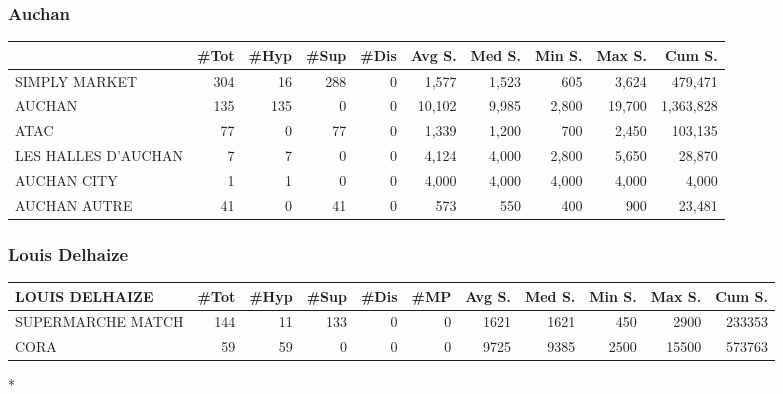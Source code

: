 \documentclass[11pt]{article}
\begin{document}
\subsubsection{Auchan}

\begin{table}[H]
\footnotesize
\setlength{\tabcolsep}{2pt}

\begin{tabular}{lrrrrrrrrr}
\toprule
\toprule
{} &       \#Tot &       \#Hyp &       \#Sup &       \#Dis &     Avg S. &     Med S. &     Min S. &     Max S. &     Cum S. \\
\midrule
SIMPLY MARKET       &        304 &         16 &        288 &          0 &      1,577 &      1,523 &        605 &      3,624 &    479,471 \\
AUCHAN              &        135 &        135 &          0 &          0 &     10,102 &      9,985 &      2,800 &     19,700 &  1,363,828 \\
ATAC                &         77 &          0 &         77 &          0 &      1,339 &      1,200 &        700 &      2,450 &    103,135 \\
LES HALLES D'AUCHAN &          7 &          7 &          0 &          0 &      4,124 &      4,000 &      2,800 &      5,650 &     28,870 \\
AUCHAN CITY         &          1 &          1 &          0 &          0 &      4,000 &      4,000 &      4,000 &      4,000 &      4,000 \\
AUCHAN AUTRE        &         41 &          0 &         41 &          0 &        573 &        550 &        400 &        900 &     23,481 \\
\bottomrule
\end{tabular}

\end{table}


\subsubsection{Louis Delhaize}

\begin{table}[H]
\footnotesize
\setlength{\tabcolsep}{2pt}

\begin{tabular}{lrrrrrrrrrr}
\toprule
\toprule
LOUIS DELHAIZE &       \#Tot &       \#Hyp &       \#Sup &       \#Dis &        \#MP &     Avg S. &     Med S. &     Min S. &     Max S. &     Cum S. \\
\midrule
SUPERMARCHE MATCH &        144 &         11 &        133 &          0 &          0 &       1621 &       1621 &        450 &       2900 &     233353 \\
CORA              &         59 &         59 &          0 &          0 &          0 &       9725 &       9385 &       2500 &      15500 &     573763 \\
\bottomrule
\end{tabular}*
\end{table}
\end{document}
